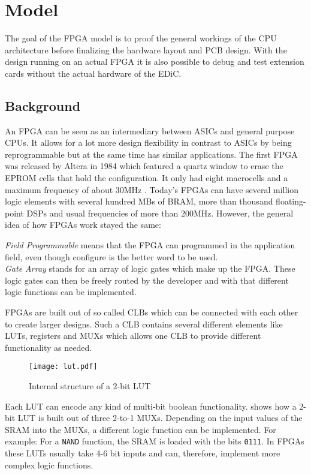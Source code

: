 \chapter{ Model}\label{cha:fpga}
The goal of the \gls{FPGA} model is to proof the general workings of the \gls{CPU} architecture before finalizing the hardware layout and \gls{PCB} design.
With the design running on an actual \gls{FPGA} it is also possible to debug and test extension cards without the actual hardware of the \gls{EDiC}.


\section{ Background}
An \gls{FPGA} can be seen as an intermediary between \glspl{ASIC} and general purpose \glspl{CPU}.
It allows for a lot more design flexibility in contrast to \glspl{ASIC} by being reprogrammable but at the same time has similar applications.
The first \gls{FPGA} was released by Altera in 1984 which featured a quartz window to erase the \gls{EPROM} cells that hold the configuration.
It only had eight macrocells and a maximum frequency of about 30MHz \cite{ref:altera_databook}.
Today's \glspl{FPGA} can have several million logic elements with several hundred MBs of \gls{BRAM}, more than thousand floating-point \glspl{DSP} and usual frequencies of more than 200MHz.
However, the general idea of how \glspl{FPGA} work stayed the same:

\emph{Field Programmable} means that the \gls{FPGA} can programmed in the application field, even though configure is the better word to be used.\\
\emph{Gate Array} stands for an array of logic gates which make up the \gls{FPGA}.
These logic gates can then be freely routed by the developer and with that different logic functions can be implemented.

\glspl{FPGA} are built out of so called \glspl{CLB} which can be connected with each other to create larger designs.
Such a \gls{CLB} contains several different elements like \glspl{LUT}, registers and \glspl{MUX} which allows one \gls{CLB} to provide different functionality as needed.
\begin{figure}
  \centering
  \texttt{[image: lut.pdf]}
  \caption{Internal structure of a 2-bit \gls{LUT}}
  \label{fig:lut}
\end{figure}
Each \gls{LUT} can encode any kind of multi-bit boolean functionality.
 shows how a 2-bit \gls{LUT} is built out of three 2-to-1 \glspl{MUX}.
Depending on the input values of the \gls{SRAM} into the \glspl{MUX}, a different logic function can be implemented.
For example: For a \texttt{NAND} function, the \gls{SRAM} is loaded with the bits \texttt{0111}.
In \glspl{FPGA} these \glspl{LUT} usually take 4-6 bit inputs and can, therefore, implement more complex logic functions.

